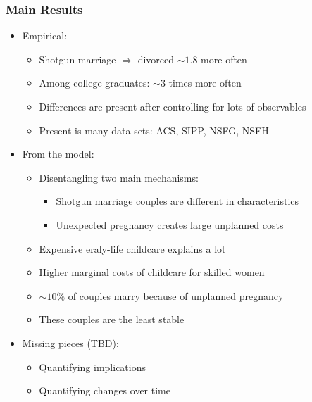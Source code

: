 \documentclass{beamer}
\begin{document}
\begin{frame}
\frametitle{Main Results}
\begin{itemize}
\item Empirical:
\begin{itemize}
\item Shotgun marriage $\Rightarrow$ divorced $\sim1.8$ more often
\item Among college graduates: $\sim3$ times more often
\item Differences are present after controlling for lots of observables
\item Present is many data sets: ACS, SIPP, NSFG, NSFH
\end{itemize}
\item From the model:
\begin{itemize}
\item Disentangling two main mechanisms:
\begin{itemize}
\item Shotgun marriage couples are different in characteristics
\item Unexpected pregnancy creates large unplanned costs
\end{itemize}
\item Expensive eraly-life childcare explains a lot
\item Higher marginal costs of childcare for skilled women
\item $\sim10\%$ of couples marry because of unplanned pregnancy
\item These couples are the least stable
\end{itemize}
\item Missing pieces (TBD):
\begin{itemize}
\item Quantifying implications
\item Quantifying changes over time
\end{itemize}
\end{itemize}
\end{frame}
\end{document}
